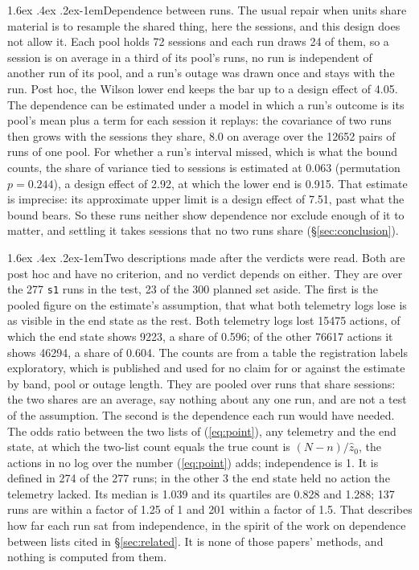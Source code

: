 \documentclass[11pt]{article}
\makeatletter
\renewcommand\paragraph{\@startsection{paragraph}{4}{\z@}%
  {1.6ex \@plus .4ex \@minus .2ex}{-1em}{\normalfont\normalsize\bfseries}}
\makeatother
\begin{document}
\paragraph{Dependence between runs.} The usual repair when units share material is to
resample the shared thing, here the sessions, and this design does not allow it. Each
pool holds 72 sessions and each run draws 24 of them, so a session is on average in a
third of its pool's runs, no run is independent of another run of its pool, and a run's
outage was drawn once and stays with the run. Post hoc, the Wilson lower end keeps the
bar up to a design effect of 4.05. The dependence can be estimated under a model in
which a run's outcome is its pool's mean plus a term for each session it replays: the
covariance of two runs then grows with the sessions they share, 8.0 on average over the
12652 pairs of runs of one pool. For whether a run's interval missed, which is what the
bound counts, the share of variance tied to sessions is estimated at 0.063 (permutation
$p=0.244$), a design effect of 2.92, at which the lower end is 0.915. That estimate is
imprecise: its approximate upper limit is a design effect of 7.51, past what the bound
bears. So these runs neither show dependence nor exclude enough of it to matter, and
settling it takes sessions that no two runs share (\S\ref{sec:conclusion}).

\paragraph{Two descriptions made after the verdicts were read.} Both are post hoc and
have no criterion, and no verdict depends on either. They are over the 277 \texttt{s1}
runs in the test, 23 of the 300 planned set aside. The first is the pooled figure on
the estimate's assumption, that what both telemetry logs lose is as visible in the end
state as the rest. Both telemetry logs lost 15475 actions, of which the end state shows
9223, a share of 0.596; of the other 76617 actions it shows 46294, a share of 0.604.
The counts are from a table the registration labels exploratory, which is published and
used for no claim for or against the estimate by band, pool or outage length. They are
pooled over runs that share sessions: the two shares are an average, say nothing about
any one run, and are not a test of the assumption. The second is the dependence each run
would have needed. The odds ratio between the two lists of (\ref{eq:point}), any
telemetry and the end state, at which the two-list count equals the true count is
$(N-n)/\hat z_0$, the actions in no log over the number (\ref{eq:point}) adds;
independence is 1. It is defined in 274 of the 277 runs; in the other 3 the end state
held no action the telemetry lacked. Its median is 1.039 and its quartiles are 0.828
and 1.288; 137 runs are within a factor of 1.25 of 1 and 201 within a factor of 1.5.
That describes how far each run sat from independence, in the spirit of the work on
dependence between lists cited in \S\ref{sec:related}. It is none of those papers'
methods, and nothing is computed from them.
\end{document}
